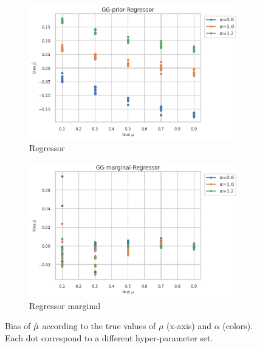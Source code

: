 \begin{figure}[ht!]
  \begin{subfigure}[t]{0.49\linewidth}
    \includegraphics[width=\linewidth]{COMPARE/GG-prior/Regressor/profusion_true_mu_target_bias.png}
    \caption{Regressor}
  \end{subfigure}%
  \hfill
  \begin{subfigure}[t]{0.49\linewidth}
    \includegraphics[width=\linewidth]{COMPARE/GG-marginal/Regressor/profusion_true_mu_target_bias.png}
    \caption{Regressor marginal}
  \end{subfigure}


  \caption{Bias of $\hat\mu$ according to the true values of $\mu$ (x-axis) and $\alpha$ (colors). Each dot correspond to a different hyper-parameter set.}
  \label{fig:gg_compare_true_mu_target_bias}
\end{figure}





